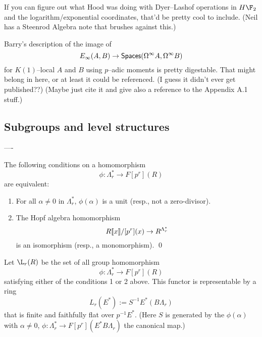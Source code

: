 If you can figure out what Hood was doing with Dyer--Lashof operations in $H\F_2$ and the logarithm/exponential coordinates, that'd be pretty cool to include.  (Neil has a Steenrod Algebra note that brushes against this.)

Barry's description of the image of \[E_\infty(A, B) \to \mathsf{Spaces}(\Omega^\infty A, \Omega^\infty B)\] for $K(1)$--local $A$ and $B$ using $p$--adic moments is pretty digestable.  That might belong in here, or at least it could be referenced.  (I guess it didn't ever get published??)  (Maybe just cite it and give also a reference to the Appendix A.1 stuff.)













\subsection*{Subgroups and level structures}




----

\begin{lemma}
The following conditions on a homomorphism \[\phi: \Lambda_r^* \to F[p^r](R)\] are equivalent:
\begin{enumerate}
\item For all $\alpha \ne 0$ in $\Lambda_r^*$, $\phi(\alpha)$ is a unit (resp., not a zero-divisor).
\item The Hopf algebra homomorphism \[R\llbracket{x}\rrbracket / [p^r](x) \to R^{\Lambda_r^*}\] is an isomorphism (resp., a monomorphism). \qed
\end{enumerate}
\end{lemma}

\begin{lemma}
Let $\L_r(R)$ be the set of all group homomorphism \[\phi: \Lambda_r^* \to F[p^r](R)\] satisfying either of the conditions 1 or 2 above.  This functor is representable by a ring \[L_r(E^*) := S^{-1} E^*(B\Lambda_r)\] that is finite and faithfully flat over $p^{-1} E^*$.  (Here $S$ is generated by the $\phi(\alpha)$ with $\alpha \ne 0$, $\phi: \Lambda_r^* \to F[p^r](E^* B\Lambda_r)$ the canonical map.)
\end{lemma}

